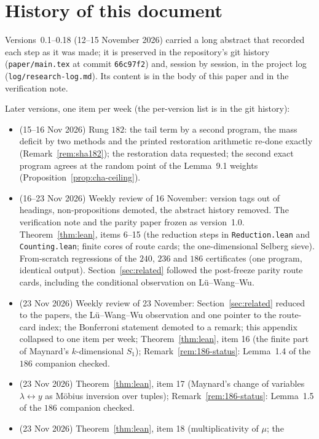 \documentclass[11pt]{amsart}
\theoremstyle{definition}
\theoremstyle{remark}
\begin{document}
\appendix
\section{History of this document}\label{app:history}
Versions~0.1--0.18 (12--15 November 2026) carried a long abstract that
recorded each step as it was made; it is preserved in the repository's git
history (\texttt{paper/main.tex} at commit \texttt{66c97f2}) and, session by
session, in the project log (\texttt{log/research-log.md}). Its content is
in the body of this paper and in the verification note.

Later versions, one item per week (the per-version list is in the git history):
\begin{itemize}
\item[0.19--0.25] (15--16 Nov 2026) Rung $182$: the tail term by a second program, the mass
deficit by two methods and the printed restoration arithmetic re-done exactly
(Remark~\ref{rem:sha182}); the restoration data requested; the second exact program agrees at
the random point of the Lemma~9.1 weights (Proposition~\ref{prop:cha-ceiling}).
\item[0.26--0.46] (16--23 Nov 2026) Weekly review of 16 November: version tags out of headings,
non-propositions demoted, the abstract history removed. The verification note and the parity
paper frozen as version~1.0. Theorem~\ref{thm:lean}, items 6--15 (the reduction steps in
\texttt{Reduction.lean} and \texttt{Counting.lean}; finite cores of route cards; the
one-dimensional Selberg sieve). From-scratch regressions of the $240$, $236$ and $186$
certificates (one program, identical output). Section~\ref{sec:related} followed the
post-freeze parity route cards, including the conditional observation on L\"u--Wang--Wu.
\item[0.47] (23 Nov 2026) Weekly review of 23 November: Section~\ref{sec:related} reduced to the
papers, the L\"u--Wang--Wu observation and one pointer to the route-card index; the
Bonferroni statement demoted to a remark; this appendix collapsed to one item per week; Theorem~\ref{thm:lean}, item 16 (the finite part of Maynard's $k$-dimensional $S_1$); Remark~\ref{rem:186-status}: Lemma~1.4 of the $186$ companion checked.
\item[0.48] (23 Nov 2026) Theorem~\ref{thm:lean}, item 17 (Maynard's change of variables
$\lambda\leftrightarrow y$ as M\"obius inversion over tuples); Remark~\ref{rem:186-status}: Lemma~1.5 of the
$186$ companion checked.
\item[0.49] (23 Nov 2026) Theorem~\ref{thm:lean}, item 18 (multiplicativity of $\mu$; the

\end{itemize}
\end{document}
